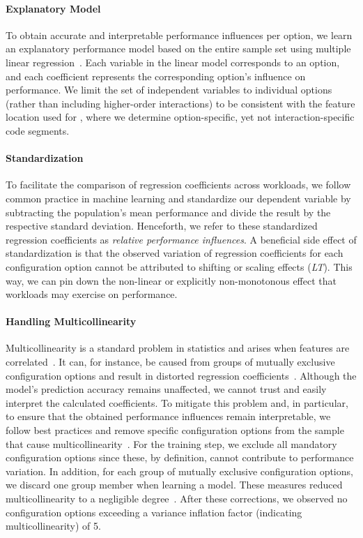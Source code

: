 {{{\paragraph*{Explanatory Model}
To obtain accurate and interpretable performance influences per option, we learn an explanatory performance model based on the entire sample set using multiple linear regression~\cite{dorn2020,siegmundPerformanceinfluenceModelsHighly2015,perLasso}. Each variable in the linear model corresponds to an option, and each coefficient represents the corresponding option's influence on performance. 
We limit the set of independent variables to individual options (rather than including higher-order interactions) to be consistent with the feature location used for , where we determine option-specific, yet not interaction-specific code segments.
\paragraph*{Standardization}
To facilitate the comparison of regression coefficients across workloads, we follow common practice in machine learning and standardize our dependent variable by subtracting the population’s mean performance and divide the result by the respective standard deviation. Henceforth, we refer to these standardized regression coefficients as \textit{relative performance influences}. A beneficial side effect of standardization is that the observed variation of regression coefficients for each configuration option cannot be attributed to shifting or scaling effects (\colorbox{lt-color!60}{\textit{LT}}). This way, we can pin down  the non-linear or explicitly non-monotonous effect that workloads may exercise on performance.
\paragraph*{Handling Multicollinearity} Multicollinearity is a standard problem in statistics and arises when features are correlated~\cite{Daoud_2017}. It can, for instance, be caused from groups of mutually exclusive configuration options and result in distorted regression coefficients~\cite{dorn2020}. Although the model's prediction accuracy remains unaffected, we cannot trust and easily interpret the calculated coefficients. To mitigate this problem and, in particular, to ensure that the obtained performance influences remain interpretable, we follow best practices and remove specific configuration options from the sample that cause multicollinearity~\cite{dorn2020}. For the training step, we exclude all mandatory configuration options since these, by definition, cannot contribute to performance variation. In addition, for each group of mutually exclusive configuration options, we discard one group member when learning a model. These measures reduced multicollinearity to a negligible degree~\cite{o2007caution}.  After these corrections, we observed no configuration options exceeding a variance inflation factor (indicating multicollinearity) of 5.


}}}
